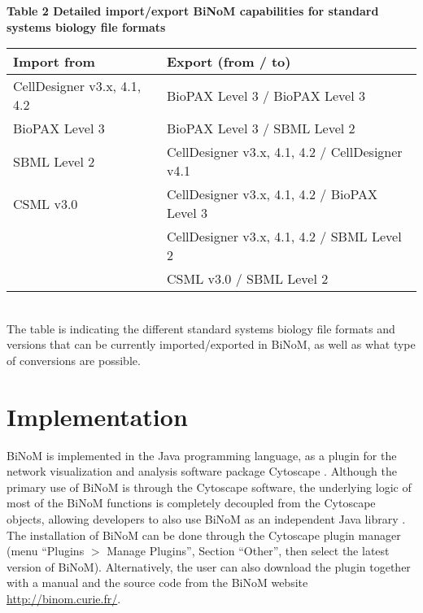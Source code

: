 \documentclass[11pt]{bmc_article_s50}
\newenvironment{bmcformat}{\begin{raggedright}\baselineskip20pt\sloppy\setboolean{publ}{false}}{\end{raggedright}\baselineskip20pt\sloppy}
\begin{document}
\begin{bmcformat}
\begin{sidewaystable}
\end{sidewaystable}


\begin{table}[!h]
  \textbf{Table 2 Detailed import/export BiNoM capabilities for standard systems biology file formats}

      \begin{tabular*}{\textwidth}{@{\extracolsep\fill}ll}
        \hline
    \textbf{Import from} & \textbf{Export (from / to)}\\
    \hline
        CellDesigner v3.x, 4.1, 4.2  & BioPAX Level 3 / BioPAX Level 3 \\
        \hline
        BioPAX Level 3 & BioPAX Level 3 / SBML Level 2 \\
        \hline
        SBML Level 2 & CellDesigner v3.x, 4.1, 4.2 / CellDesigner v4.1 \\
        \hline
        CSML v3.0  & CellDesigner v3.x, 4.1, 4.2 / BioPAX Level 3 \\
        \hline
           & CellDesigner v3.x, 4.1, 4.2 / SBML Level 2 \\
        \hline
           & CSML v3.0 / SBML Level 2 \\
        \hline
      \end{tabular*}\\
 The table is indicating the different standard systems biology file formats and versions that can be currently imported/exported in BiNoM, as well as what type of conversions are possible.
\end{table}


\section*{Implementation}
BiNoM is implemented in the Java\texttrademark{} programming language, as a plugin
for the network visualization and analysis software package Cytoscape
\cite{cline2007integration}. Although the primary use of BiNoM is through the
Cytoscape software, the underlying logic of most of the BiNoM functions is completely
decoupled from the Cytoscape objects, allowing developers to also use BiNoM as
an independent Java library \cite{zinovyev2008binom}. The installation of BiNoM
can be done through the Cytoscape plugin manager (menu ``Plugins $>$ Manage
Plugins'', Section ``Other'', then select the latest version of BiNoM). Alternatively, the user can
also download the plugin together with a manual and the source code from the
BiNoM website \url{http://binom.curie.fr/}.


\end{bmcformat}
\end{document}

